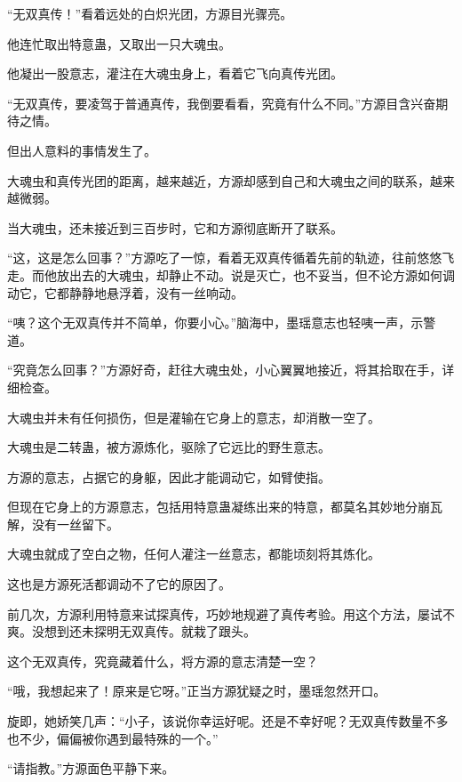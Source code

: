 
\begin{this_body}



“无双真传！”看着远处的白炽光团，方源目光骤亮。

他连忙取出特意蛊，又取出一只大魂虫。

他凝出一股意志，灌注在大魂虫身上，看着它飞向真传光团。

“无双真传，要凌驾于普通真传，我倒要看看，究竟有什么不同。”方源目含兴奋期待之情。

但出人意料的事情发生了。

大魂虫和真传光团的距离，越来越近，方源却感到自己和大魂虫之间的联系，越来越微弱。

当大魂虫，还未接近到三百步时，它和方源彻底断开了联系。

“这，这是怎么回事？”方源吃了一惊，看着无双真传循着先前的轨迹，往前悠悠飞走。而他放出去的大魂虫，却静止不动。说是灭亡，也不妥当，但不论方源如何调动它，它都静静地悬浮着，没有一丝响动。

“咦？这个无双真传并不简单，你要小心。”脑海中，墨瑶意志也轻咦一声，示警道。

“究竟怎么回事？”方源好奇，赶往大魂虫处，小心翼翼地接近，将其拾取在手，详细检查。

大魂虫并未有任何损伤，但是灌输在它身上的意志，却消散一空了。

大魂虫是二转蛊，被方源炼化，驱除了它远比的野生意志。

方源的意志，占据它的身躯，因此才能调动它，如臂使指。

但现在它身上的方源意志，包括用特意蛊凝练出来的特意，都莫名其妙地分崩瓦解，没有一丝留下。

大魂虫就成了空白之物，任何人灌注一丝意志，都能顷刻将其炼化。

这也是方源死活都调动不了它的原因了。

前几次，方源利用特意来试探真传，巧妙地规避了真传考验。用这个方法，屡试不爽。没想到还未探明无双真传。就栽了跟头。

这个无双真传，究竟藏着什么，将方源的意志清楚一空？

“哦，我想起来了！原来是它呀。”正当方源犹疑之时，墨瑶忽然开口。

旋即，她娇笑几声：“小子，该说你幸运好呢。还是不幸好呢？无双真传数量不多也不少，偏偏被你遇到最特殊的一个。”

“请指教。”方源面色平静下来。


\end{this_body}
